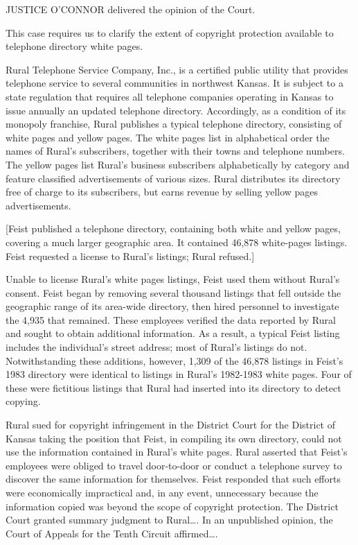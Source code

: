 
JUSTICE O'CONNOR delivered the opinion of the Court.

This case requires us to clarify the extent of copyright protection available to
telephone directory white pages.


Rural Telephone Service Company, Inc., is a certified public utility that
provides telephone service to several communities in northwest Kansas. It is
subject to a state regulation that requires all telephone companies operating
in Kansas to issue annually an updated telephone directory. Accordingly, as a
condition of its monopoly franchise, Rural publishes a typical telephone
directory, consisting of white pages and yellow pages. The white pages list in
alphabetical order the names of Rural's subscribers, together with their towns
and telephone numbers. The yellow pages list Rural's business subscribers
alphabetically by category and feature classified advertisements of various
sizes. Rural distributes its directory free of charge to its subscribers, but
earns revenue by selling yellow pages advertisements.

[Feist published a telephone directory, containing both white and yellow pages,
covering a much larger geographic area. It contained 46,878 white-pages
listings. Feist requested a license to Rural's listings; Rural refused.]

Unable to license Rural's white pages listings, Feist used them without Rural's
consent. Feist began by removing several thousand listings that fell outside
the geographic range of its area-wide directory, then hired personnel to
investigate the 4,935 that remained. These employees verified the data reported
by Rural and sought to obtain additional information. As a result, a typical
Feist listing includes the individual's street address; most of Rural's
listings do not. Notwithstanding these additions, however, 1,309 of the 46,878
listings in Feist's 1983 directory were identical to listings in Rural's
1982-1983 white pages. Four of these were fictitious listings that Rural had
inserted into its directory to detect copying.

Rural sued for copyright infringement in the District Court for the District of
Kansas taking the position that Feist, in compiling its own directory, could
not use the information contained in Rural's white pages. Rural asserted that
Feist's employees were obliged to travel door-to-door or conduct a telephone
survey to discover the same information for themselves. Feist responded that
such efforts were economically impractical and, in any event, unnecessary
because the information copied was beyond the scope of copyright protection.
The District Court granted summary judgment to Rural\ldots. In an
unpublished opinion, the Court of Appeals for the Tenth Circuit affirmed\dots.

